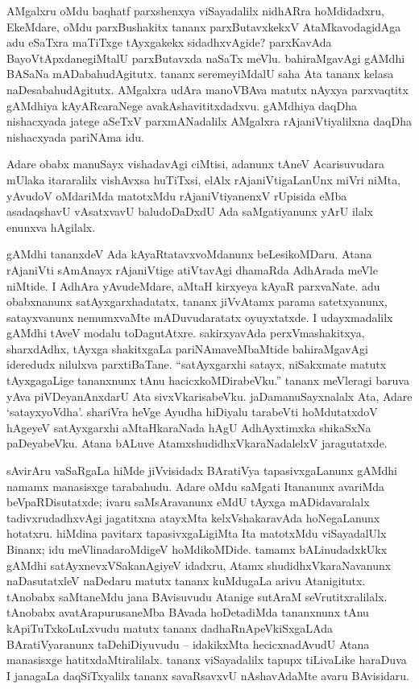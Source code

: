 AMgalxru oMdu baqhatf parxshenxya viSayadalilx nidhARra hoMdidadxru, EkeMdare, oMdu parxBushakitx tananx parxButavxkekxV AtaMkavodagidAga adu eSaTxra maTiTxge tAyxgakekx sidadhxvAgide? parxKavAda BayoVtApxdanegiMtalU parxButavxda naSaTx meVlu. bahiraMgavAgi gAMdhi BASaNa mADabahudAgitutx. tananx seremeyiMdalU saha Ata tananx kelasa naDesabahudAgitutx. AMgalxra udAra manoVBAva matutx nAyxya parxvaqtitx gAMdhiya kAyARcaraNege avakAshavititxdadxvu. gAMdhiya daqDha nishacxyada jatege aSeTxV parxmANadalilx AMgalxra rAjaniVtiyalilxna daqDha nishacxyada pariNAma idu.

Adare obabx manuSayx vishadavAgi ciMtisi, adanunx tAneV Acarisuvudara mUlaka itararalilx vishAvxsa huTiTxsi, elAlx rAjaniVtigaLanUnx miVri niMta, yAvudoV oMdariMda matotxMdu rAjaniVtiyanenxV rUpisida eMba asadaqshavU vAsatxvavU baludoDaDxdU Ada saMgatiyanunx yArU ilalx enunxva hAgilalx.

gAMdhi tananxdeV Ada kAyaRtatavxvoMdanunx beLesikoMDaru. Atana rAjaniVti sAmAnayx rAjaniVtige atiVtavAgi dhamaRda AdhArada meVle niMtide. I AdhAra yAvudeMdare, aMtaH kirxyeya kAyaR parxvaNate. adu obabxnanunx satAyxgarxhadatatx, tananx jiVvAtamx parama satetxyanunx, satayxvanunx nemumxvaMte mADuvudaratatx oyuyxtatxde. I udayxmadalilx gAMdhi tAveV modalu toDagutAtxre. sakirxyavAda perxVmashakitxya, sharxdAdhx, tAyxga shakitxgaLa pariNAmaveMbaMtide bahiraMgavAgi ideredudx nilulxva parxtiBaTane. ``satAyxgarxhi satayx, niSakxmate matutx tAyxgagaLige tananxnunx tAnu hacicxkoMDirabeVku.'' tananx meVleragi baruva yAva piVDeyanAnxdarU Ata sivxVkarisabeVku. jaDamanuSayxnalalx Ata, Adare `satayxyoVdha'. shariVra heVge Ayudha hiDiyalu tarabeVti hoMdutatxdoV hAgeyeV satAyxgarxhi aMtaHkaraNada hAgU AdhAyxtimxka shikaSxNa paDeyabeVku. Atana bALuve AtamxshudidhxVkaraNadalelxV jaragutatxde.

sAvirAru vaSaRgaLa hiMde jiVvisidadx BAratiVya tapasivxgaLanunx gAMdhi namamx manasisxge tarabahudu. Adare oMdu saMgati Itananunx avariMda beVpaRDisutatxde; ivaru saMsAravanunx eMdU tAyxga mADidavaralalx tadivxrudadhxvAgi jagatitxna atayxMta kelxVshakaravAda hoNegaLanunx hotatxru. hiMdina pavitarx tapasivxgaLigiMta Ita matotxMdu viSayadalUlx Binanx; idu meVlinadaroMdigeV hoMdikoMDide. tamamx bALinudadxkUkx gAMdhi satAyxnevxVSakanAgiyeV idadxru, Atamx shudidhxVkaraNavanunx naDasutatxleV naDedaru matutx tananx kuMdugaLa arivu Atanigitutx. tAnobabx saMtaneMdu jana BAvisuvudu Atanige sutAraM seVrutitxralilalx. tAnobabx avatArapurusaneMba BAvada hoDetadiMda tananxnunx tAnu kApiTuTxkoLuLxvudu matutx tananx dadhaRnApeVkiSxgaLAda BAratiVyaranunx taDehiDiyuvudu -- idakikxMta hecicxnadAvudU Atana manasisxge hatitxdaMtiralilalx. tananx viSayadalilx tapupx tiLivaLike haraDuva I janagaLa daqSiTxyalilx tananx savaRsavxvU nAshavAdaMte avaru BAvisidaru.


